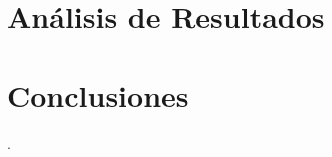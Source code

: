 \documentclass[letterpaper,11pt]{article} %
\begin{document}
\newpage
\section{Análisis de Resultados}



\newpage
\section{Conclusiones}.




\end{document}
